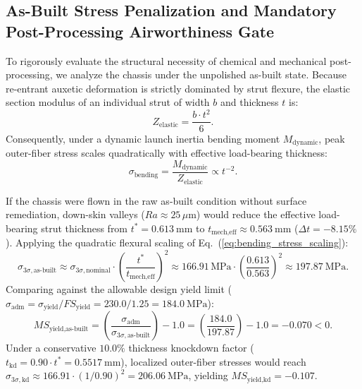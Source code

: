 \subsection{As-Built Stress Penalization and Mandatory Post-Processing Airworthiness Gate}
To rigorously evaluate the structural necessity of chemical and mechanical post-processing, we analyze the chassis under the unpolished as-built state. Because re-entrant auxetic deformation is strictly dominated by strut flexure, the elastic section modulus of an individual strut of width $b$ and thickness $t$ is:
\begin{equation}
Z_{\text{elastic}} = \frac{b \cdot t^2}{6}.
\label{eq:section_modulus}
\end{equation}
Consequently, under a dynamic launch inertia bending moment $M_{\text{dynamic}}$, peak outer-fiber stress scales quadratically with effective load-bearing thickness:
\begin{equation}
\sigma_{\text{bending}} = \frac{M_{\text{dynamic}}}{Z_{\text{elastic}}} \propto t^{-2}.
\label{eq:bending_stress_scaling}
\end{equation}

If the chassis were flown in the raw as-built condition without surface remediation, down-skin valleys ($Ra \approx 25\,\mu\text{m}$) would reduce the effective load-bearing strut thickness from $t^* = \SI{0.613}{\milli\meter}$ to $t_{\text{mech,eff}} \approx \SI{0.563}{\milli\meter}$ ($\Delta t = -8.15\%$). Applying the quadratic flexural scaling of Eq.~(\ref{eq:bending_stress_scaling}):
\begin{equation}
\sigma_{3\sigma,\text{as-built}} \approx \sigma_{3\sigma,\text{nominal}} \cdot \left(\frac{t^*}{t_{\text{mech,eff}}}\right)^2 \approx 166.91\,\text{MPa} \cdot \left(\frac{0.613}{0.563}\right)^2 \approx \SI{197.87}{\mega\pascal}.
\label{eq:sigma_as_built}
\end{equation}
Comparing against the allowable design yield limit ($\sigma_{\text{adm}} = \sigma_{\text{yield}} / FS_{\text{yield}} = 230.0 / 1.25 = \SI{184.0}{\mega\pascal}$):
\begin{equation}
MS_{\text{yield,as-built}} = \left(\frac{\sigma_{\text{adm}}}{\sigma_{3\sigma,\text{as-built}}}\right) - 1.0 = \left(\frac{184.0}{197.87}\right) - 1.0 = \mathbf{-0.070} < 0.
\label{eq:ms_yield_as_built}
\end{equation}
Under a conservative $10.0\%$ thickness knockdown factor ($t_{\text{kd}} = 0.90 \cdot t^* = \SI{0.5517}{\milli\meter}$), localized outer-fiber stresses would reach $\sigma_{3\sigma,\text{kd}} \approx 166.91 \cdot (1 / 0.90)^2 = \SI{206.06}{\mega\pascal}$, yielding $MS_{\text{yield,kd}} = -0.107$.


